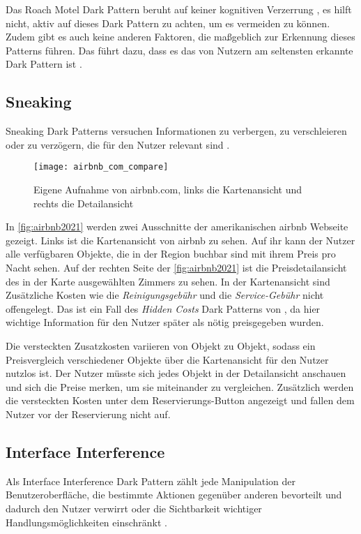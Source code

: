 \documentclass[conference,compsoc,final,a4paper]{IEEEtran}
\begin{document}
Das Roach Motel Dark Pattern beruht auf keiner kognitiven Verzerrung \autocite{Mathur2019}, es hilft nicht, aktiv auf dieses Dark Pattern zu achten, um es vermeiden zu können. Zudem gibt es auch keine anderen Faktoren, die maßgeblich zur Erkennung dieses Patterns führen. Das führt dazu, dass es das von Nutzern am seltensten erkannte Dark Pattern ist \autocite{M.Bhoot2020}.
\subsection{Sneaking}
Sneaking Dark Patterns versuchen Informationen zu verbergen, zu verschleieren oder zu verzögern, die für den Nutzer relevant sind \autocite{Gray_2018}.

\begin{figure}[ht!]
  \centering
  \texttt{[image: airbnb\_com\_compare]}
  \caption{Eigene Aufnahme von airbnb.com, links die Kartenansicht und rechts die Detailansicht ~\autocite{airbnb2021}}
  \label{fig:airbnb2021}
\end{figure}

In \autoref{fig:airbnb2021} werden zwei Ausschnitte der amerikanischen airbnb Webseite gezeigt. Links ist die Kartenansicht von airbnb zu sehen. Auf ihr kann der Nutzer alle verfügbaren Objekte, die in der Region buchbar sind mit ihrem Preis pro Nacht sehen. Auf der rechten Seite der \autoref{fig:airbnb2021} ist die Preisdetailansicht des in der Karte ausgewählten Zimmers zu sehen. In der Kartenansicht sind Zusätzliche Kosten wie die \textit{Reinigungsgebühr} und die \textit{Service-Gebühr} nicht offengelegt. Das ist ein Fall des \textit{Hidden Costs} Dark Patterns von \citeauthor{Brignull} \autocite{Brignull}, da hier wichtige Information für den Nutzer später als nötig preisgegeben wurden.

Die versteckten Zusatzkosten variieren von Objekt zu Objekt, sodass ein Preisvergleich verschiedener Objekte über die Kartenansicht für den Nutzer nutzlos ist. Der Nutzer müsste sich jedes Objekt in der Detailansicht anschauen und sich die Preise merken, um sie miteinander zu vergleichen. Zusätzlich werden die versteckten Kosten unter dem Reservierungs-Button angezeigt und fallen dem Nutzer vor der Reservierung nicht auf.

\subsection{Interface Interference}
Als Interface Interference Dark Pattern zählt jede Manipulation der Benutzeroberfläche, die bestimmte Aktionen gegenüber anderen bevorteilt und dadurch den Nutzer verwirrt oder die Sichtbarkeit wichtiger Handlungsmöglichkeiten einschränkt \autocite{Gray_2018}.
\end{document}
